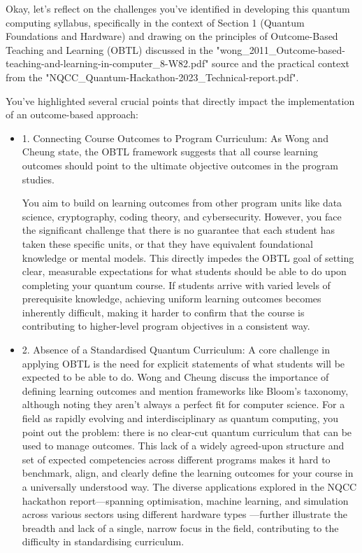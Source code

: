 \documentclass[11pt,a4paper]{article}
\begin{document}
Okay, let's reflect on the challenges you've identified in developing this quantum computing syllabus, specifically in the context of Section 1 (Quantum Foundations and Hardware) and drawing on the principles of Outcome-Based Teaching and Learning (OBTL) discussed in the "wong\_2011\_Outcome-based-teaching-and-learning-in-computer\_8-W82.pdf" source and the practical context from the "NQCC\_Quantum-Hackathon-2023\_Technical-report.pdf".

You've highlighted several crucial points that directly impact the implementation of an outcome-based approach:


\begin{itemize}	

\item 1.
Connecting Course Outcomes to Program Curriculum: As Wong and Cheung state, the OBTL framework suggests that all course learning outcomes should point to the ultimate objective outcomes in the program studies.

You aim to build on learning outcomes from other program units like data science, cryptography, coding theory, and cybersecurity. However, you face the significant challenge that there is no guarantee that each student has taken these specific units, or that they have equivalent foundational knowledge or mental models. This directly impedes the OBTL goal of setting clear, measurable expectations for what students should be able to do upon completing your quantum course. If students arrive with varied levels of prerequisite knowledge, achieving uniform learning outcomes becomes inherently difficult, making it harder to confirm that the course is contributing to higher-level program objectives in a consistent way.

\item 2. Absence of a Standardised Quantum Curriculum: A core challenge in applying OBTL is the need for explicit statements of what students will be expected to be able to do. Wong and Cheung discuss the importance of defining learning outcomes and mention frameworks like Bloom's taxonomy, although noting they aren't always a perfect fit for computer science. For a field as rapidly evolving and interdisciplinary as quantum computing, you point out the problem: there is no clear-cut quantum curriculum that can be used to manage outcomes. This lack of a widely agreed-upon structure and set of expected competencies across different programs makes it hard to benchmark, align, and clearly define the learning outcomes for your course in a universally understood way. The diverse applications explored in the NQCC hackathon report—spanning optimisation, machine learning, and simulation across various sectors using different hardware types
—further illustrate the breadth and lack of a single, narrow focus in the field, contributing to the difficulty in standardising curriculum.


\end{itemize}
\end{document}
